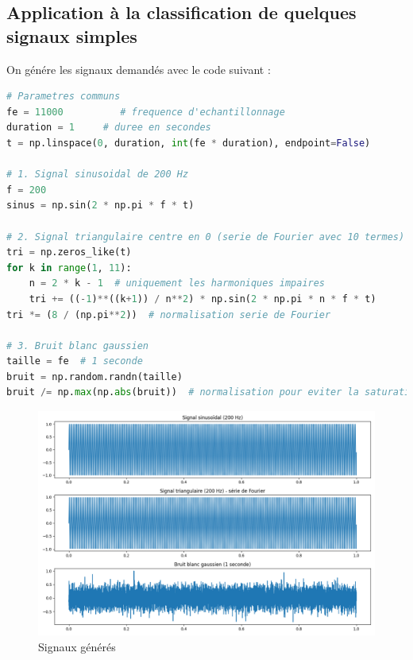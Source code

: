 \subsection{Application à la classification de quelques signaux simples}

On génére les signaux demandés avec le code suivant :
\newpage
\begin{lstlisting}[language=Python]
# Parametres communs
fe = 11000          # frequence d'echantillonnage
duration = 1     # duree en secondes
t = np.linspace(0, duration, int(fe * duration), endpoint=False)

# 1. Signal sinusoidal de 200 Hz
f = 200
sinus = np.sin(2 * np.pi * f * t)

# 2. Signal triangulaire centre en 0 (serie de Fourier avec 10 termes)
tri = np.zeros_like(t)
for k in range(1, 11):
    n = 2 * k - 1  # uniquement les harmoniques impaires
    tri += ((-1)**((k+1)) / n**2) * np.sin(2 * np.pi * n * f * t)
tri *= (8 / (np.pi**2))  # normalisation serie de Fourier

# 3. Bruit blanc gaussien
taille = fe  # 1 seconde
bruit = np.random.randn(taille)
bruit /= np.max(np.abs(bruit))  # normalisation pour eviter la saturation
\end{lstlisting}

\begin{figure}[!h]
\centering
\includegraphics[width=17cm]{screenshots/generation_signaux.png}
\caption{Signaux générés}
\end{figure} 

